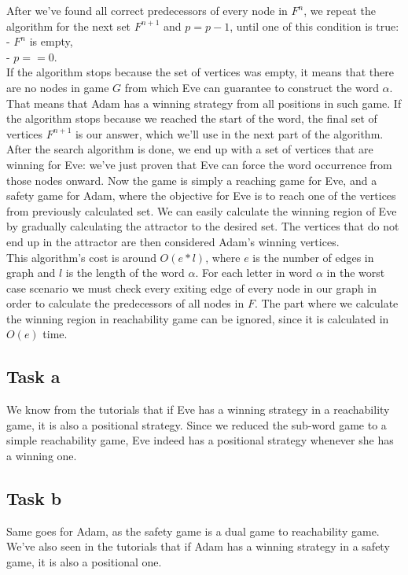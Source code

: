 \documentclass{article}
\begin{document}
After we've found all correct predecessors of every node in $F^{n}$, we repeat the algorithm for the next set $F^{n+1}$ and $p = p - 1$, until one of this condition is true: \\
- $F^{n}$ is empty, \\
- $p == 0$. \\
If the algorithm stops because the set of vertices was empty, it means that there are no nodes in game $G$ from which Eve can guarantee to construct the word $\alpha$. That means that Adam has a winning strategy from all positions in such game. If the algorithm stops because we reached the start of the word, the final set of vertices $F^{n+1}$ is our answer, which we'll use in the next part of the algorithm. \\

After the search algorithm is done, we end up with a set of vertices that are winning for Eve: we've just proven that Eve can force the word occurrence from those nodes onward. Now the game is simply a reaching game for Eve, and a safety game for Adam, where the objective for Eve is to reach one of the vertices from previously calculated set. We can easily calculate the winning region of Eve by gradually calculating the attractor to the desired set. The vertices that do not end up in the attractor are then considered Adam's winning vertices. \\

This algorithm's cost is around $O(e * l)$, where $e$ is the number of edges in graph and $l$ is the length of the word $\alpha$. For each letter in word $\alpha$ in the worst case scenario we must check every exiting edge of every node in our graph in order to calculate the predecessors of all nodes in $F$. The part where we calculate the winning region in reachability game can be ignored, since it is calculated in $O(e)$ time. \\

\subsection*{Task a}

We know from the tutorials that if Eve has a winning strategy in a reachability game, it is also a positional strategy. Since we reduced the sub-word game to a simple reachability game, Eve indeed has a positional strategy whenever she has a winning one. \\

\subsection*{Task b}

Same goes for Adam, as the safety game is a dual game to reachability game. We've also seen in the tutorials that if Adam has a winning strategy in a safety game, it is also a positional one.
\end{document}
